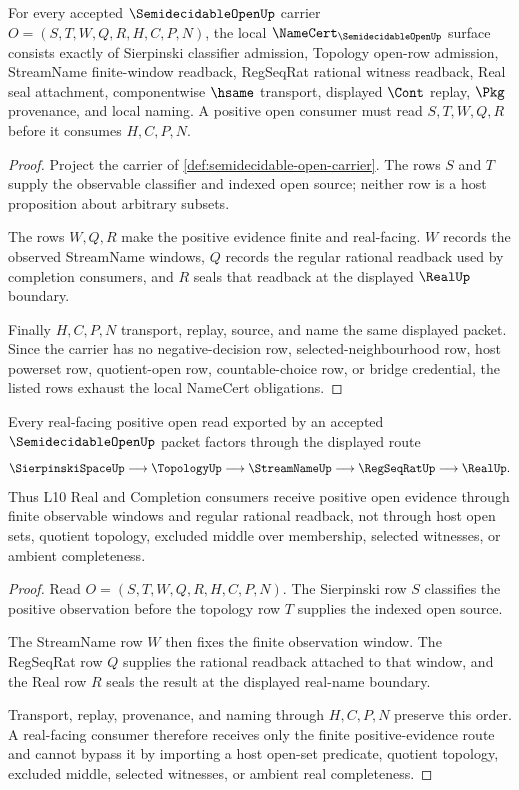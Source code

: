 \begin{theorem}
\label{thm:semidecidable-open-namecert-obligations}
For every accepted $\SemidecidableOpenUp$ carrier $O=(S,T,W,Q,R,H,C,P,N)$, the local $\NameCert_{\SemidecidableOpenUp}$ surface consists exactly of Sierpinski classifier admission, Topology open-row admission, StreamName finite-window readback, RegSeqRat rational witness readback, Real seal attachment, componentwise $\hsame$ transport, displayed $\Cont$ replay, $\Pkg$ provenance, and local naming. A positive open consumer must read $S,T,W,Q,R$ before it consumes $H,C,P,N$.
\end{theorem}
\begin{proof}
Project the carrier of \autoref{def:semidecidable-open-carrier}. The rows $S$ and $T$ supply the observable classifier and indexed open source; neither row is a host proposition about arbitrary subsets.

The rows $W,Q,R$ make the positive evidence finite and real-facing. $W$ records the observed StreamName windows, $Q$ records the regular rational readback used by completion consumers, and $R$ seals that readback at the displayed $\RealUp$ boundary.

Finally $H,C,P,N$ transport, replay, source, and name the same displayed packet. Since the carrier has no negative-decision row, selected-neighbourhood row, host powerset row, quotient-open row, countable-choice row, or bridge credential, the listed rows exhaust the local NameCert obligations.
\end{proof}

\begin{theorem}
\label{thm:semidecidable-open-real-observation-route}
Every real-facing positive open read exported by an accepted $\SemidecidableOpenUp$ packet factors through the displayed route
$$
\SierpinskiSpaceUp \longrightarrow \TopologyUp \longrightarrow \StreamNameUp \longrightarrow \RegSeqRatUp \longrightarrow \RealUp .
$$
Thus L10 Real and Completion consumers receive positive open evidence through finite observable windows and regular rational readback, not through host open sets, quotient topology, excluded middle over membership, selected witnesses, or ambient completeness.
\end{theorem}
\begin{proof}
Read $O=(S,T,W,Q,R,H,C,P,N)$. The Sierpinski row $S$ classifies the positive observation before the topology row $T$ supplies the indexed open source.

The StreamName row $W$ then fixes the finite observation window. The RegSeqRat row $Q$ supplies the rational readback attached to that window, and the Real row $R$ seals the result at the displayed real-name boundary.

Transport, replay, provenance, and naming through $H,C,P,N$ preserve this order. A real-facing consumer therefore receives only the finite positive-evidence route and cannot bypass it by importing a host open-set predicate, quotient topology, excluded middle, selected witnesses, or ambient real completeness.
\end{proof}

